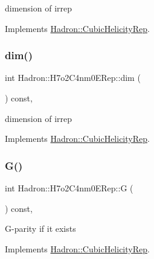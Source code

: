 dimension of irrep 

Implements \mbox{\hyperlink{structHadron_1_1CubicHelicityRep_a95d229a05580e65f8bdde74a1e316855}{Hadron\+::\+Cubic\+Helicity\+Rep}}.

\mbox{\label{structHadron_1_1H7o2C4nm0ERep_aed3aeb03b51c80a7ee0d02b8cc1a3ecf}} 
\subsubsection{\texorpdfstring{dim()}{dim()}\hspace{0.1cm}{\footnotesize\ttfamily [3/3]}}
{\footnotesize\ttfamily int Hadron\+::\+H7o2\+C4nm0\+E\+Rep\+::dim (\begin{DoxyParamCaption}{ }\end{DoxyParamCaption}) const\hspace{0.3cm}{\ttfamily [inline]}, {\ttfamily [virtual]}}

dimension of irrep 

Implements \mbox{\hyperlink{structHadron_1_1CubicHelicityRep_a95d229a05580e65f8bdde74a1e316855}{Hadron\+::\+Cubic\+Helicity\+Rep}}.

\mbox{\label{structHadron_1_1H7o2C4nm0ERep_a41ed014e3b78c3dfc40b8e8afee43477}} 
\subsubsection{\texorpdfstring{G()}{G()}\hspace{0.1cm}{\footnotesize\ttfamily [1/3]}}
{\footnotesize\ttfamily int Hadron\+::\+H7o2\+C4nm0\+E\+Rep\+::G (\begin{DoxyParamCaption}{ }\end{DoxyParamCaption}) const\hspace{0.3cm}{\ttfamily [inline]}, {\ttfamily [virtual]}}

G-\/parity if it exists 

Implements \mbox{\hyperlink{structHadron_1_1CubicHelicityRep_a50689f42be1e6170aa8cf6ad0597018b}{Hadron\+::\+Cubic\+Helicity\+Rep}}.

\mbox{\label{structHadron_1_1H7o2C4nm0ERep_a41ed014e3b78c3dfc40b8e8afee43477}} 
